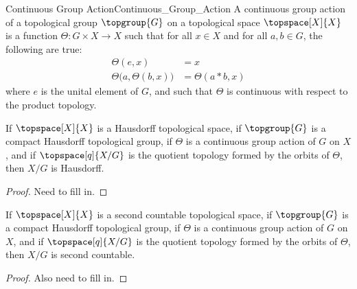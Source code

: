         \begin{fdefinition}{Continuous Group Action}{Continuous_Group_Action}
            A continuous group action of a topological group $\topgroup{G}$
            on a topological space $\topspace[X]{X}$ is a function
            $\Theta:G\times{X}\rightarrow{X}$ such that for all $x\in{X}$ and
            for all $a,b\in{G}$, the following are true:
            \begin{align*}
                \Theta(e,x)&=x\\
                \Theta\big(a,\Theta(b,x)\big)&=\Theta(a*b,x)
            \end{align*}
            where $e$ is the unital element of $G$, and such that $\Theta$ is
            continuous with respect to the product topology.
        \end{fdefinition}
        \begin{theorem}
            \label{thm:Quotient_by_Compact_T2_Group_Preserves_T2}%
            If $\topspace[X]{X}$ is a Hausdorff topological space, if
            $\topgroup{G}$ is a compact Hausdorff topological group, if
            $\Theta$ is a continuous group action of $G$ on $X$, and if
            $\topspace[q]{X/G}$ is the quotient topology formed by the orbits
            of $\Theta$, then $X/G$ is Hausdorff.
        \end{theorem}
        \begin{proof}
            Need to fill in.
        \end{proof}
        \begin{theorem}
            \label{thm:Quotient_by_Compact_T2_Group_Preserves_Sec_Count}%
            If $\topspace[X]{X}$ is a second countable topological space, if
            $\topgroup{G}$ is a compact Hausdorff topological group, if
            $\Theta$ is a continuous group action of $G$ on $X$, and if
            $\topspace[q]{X/G}$ is the quotient topology formed by the orbits
            of $\Theta$, then $X/G$ is second countable.
        \end{theorem}
        \begin{proof}
            Also need to fill in.
        \end{proof}
